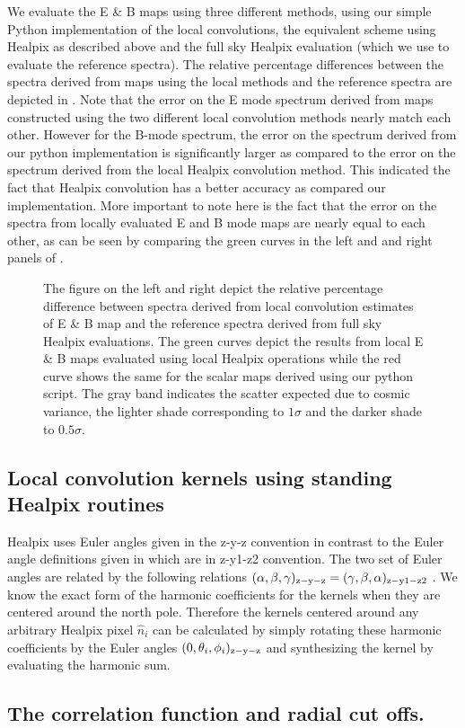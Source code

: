 We evaluate the E \& B maps using three different methods,  using our simple Python implementation of the local convolutions, the equivalent scheme using Healpix as described above and the full sky Healpix evaluation (which we use to evaluate the reference spectra). The relative percentage differences between the spectra derived from maps using the local methods and the reference spectra are depicted in . Note that the error on the E mode spectrum derived from maps constructed using the two different local convolution methods nearly match each other. However for the B-mode spectrum, the error on the spectrum derived from our python implementation is significantly larger as compared to the error on the spectrum derived from the local Healpix convolution method. This indicated the fact that Healpix convolution has a better accuracy as compared our implementation. More important to note here is the fact that the error on the spectra from locally evaluated E and B mode maps are nearly equal to each other, as can be seen by comparing the green curves in the left and and right panels of .
%
\begin{figure}[!h] 
\centering
{}
\caption{The figure on the left and right depict the relative percentage difference between spectra derived from local convolution estimates of E \& B map and the reference spectra derived from full sky Healpix evaluations. The green curves depict the results from local E \& B maps evaluated using local Healpix operations while the red curve shows the same for the scalar maps derived using our python script. The gray band indicates the scatter expected due to cosmic variance, the lighter shade corresponding to $1\sigma$ and the darker shade to $0.5 \sigma$. }
\label{fig:convolution-err}
\end{figure}
%

\subsection{Local convolution kernels using standing Healpix routines}\label{sec:rot_ker_healpix}
Healpix uses Euler angles given in the z-y-z convention in contrast to the Euler angle definitions given in  which are in z-y1-z2 convention. The two set of Euler angles are related by the following relations $(\alpha,\beta,\gamma)_{\rm z-y-z} = (\gamma,\beta,\alpha)_{\rm z-y1-z2}$ \cite{varshalovich}. We know the exact form of the harmonic coefficients for the kernels when they are centered around the north pole. Therefore the kernels centered around any arbitrary Healpix pixel $\hat{n}_i$ can be calculated by simply rotating these harmonic coefficients by the Euler angles $(0,\theta_i,\phi_i)_{\rm z-y-z}$ and synthesizing the kernel by evaluating the harmonic sum.
\subsection{The correlation function and radial cut offs.}\label{sec:corrfn_rad_cutoff}

